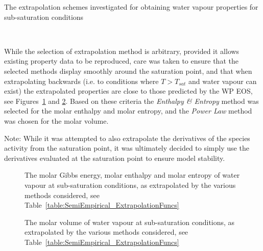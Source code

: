     \begin{table}[H]
        \caption{The extrapolation schemes investigated for obtaining water vapour properties for sub-saturation conditions}
        \centering 
        \label{table:SemiEmpirical_ExtrapolationFuncs}
                
        \\[10pt]
    \end{table}

    While the selection of extrapolation method is arbitrary, provided it allows existing property data to be reproduced, care was taken to ensure that the selected methods display smoothly around the saturation point, and that when extrapolating backwards (i.e. to conditions where \(T>T_{sat}\) and water vapour can exist) the extrapolated properties are close to those predicted by the \ac{WP} \ac{EOS}, see Figures~\ref{fig:SemiEmpirical_extrapolation1} and \ref{fig:SemiEmpirical_extrapolation2}. Based on these criteria the \emph{Enthalpy \& Entropy} method was selected for the molar enthalpy and molar entropy, and the \emph{Power Law} method was chosen for the molar volume.

    \begin{notes}{Note:}
        While it was attempted to also extrapolate the derivatives of the species activity from the saturation point, it was ultimately decided to simply use the derivatives evaluated at the saturation point to ensure model stability.
    \end{notes}

    \begin{figure}[H]
        \centering
        
        \caption{The molar Gibbs energy, molar enthalpy and molar entropy of water vapour at sub-saturation conditions, as extrapolated by the various methods considered, see Table~\ref{table:SemiEmpirical_ExtrapolationFuncs}}
        \label{fig:SemiEmpirical_extrapolation1}
    \end{figure}

    \begin{figure}[H]
        \centering
        
        \caption{The molar volume of water vapour at sub-saturation conditions, as extrapolated by the various methods considered, see Table~\ref{table:SemiEmpirical_ExtrapolationFuncs}}
        \label{fig:SemiEmpirical_extrapolation2}
    \end{figure}


